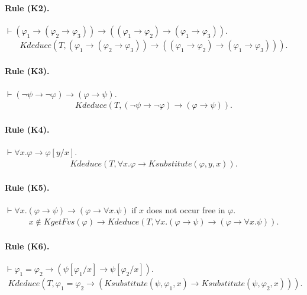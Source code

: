 \documentclass[UTF8]{article}
\theoremstyle{plain}
\theoremstyle{definition}
\theoremstyle{remark}
\newcommand{\kimplies}{\to}
\newcommand{\knot}{\neg}
\newcommand{\kforall}{\forall}
\newcommand{\kequals}{=}
\newcommand{\KgetFvs}{\mathit{KgetFvs}}
\newcommand{\Ksubstitute}{\mathit{Ksubstitute}}
\newcommand{\Kdeduce}{\mathit{Kdeduce}}
\begin{document}
\paragraph{Rule (K2).}
$\vdash (\varphi_1 \to (\varphi_2 \to \varphi_3)) \to ((\varphi_1 \to \varphi_2) \to (\varphi_1 \to \varphi_3))$.
\begin{align*}
\Kdeduce(T, (\varphi_1 \kimplies (\varphi_2 \kimplies \varphi_3)) \kimplies ((\varphi_1 \kimplies \varphi_2) \kimplies (\varphi_1 \kimplies \varphi_3))).
\end{align*}

\paragraph{Rule (K3).}
$\vdash (\neg \psi \to \neg \varphi) \to (\varphi \to \psi)$.
\begin{align*}
\Kdeduce(T, (\knot \psi \kimplies \knot \varphi) \kimplies (\varphi \kimplies \psi)).
\end{align*}

\paragraph{Rule (K4).}
$\vdash \forall x . \varphi \to \varphi[y/x]$.
\begin{align*}
\Kdeduce(T, \kforall x . \varphi \kimplies \Ksubstitute(\varphi, y, x)).
\end{align*}

\paragraph{Rule (K5).}
$\vdash \forall x . (\varphi \to \psi) \to (\varphi \to \forall x . \psi)$ if $x$ does not occur free in $\varphi$. 
\begin{align*}
x \not\in \KgetFvs(\varphi)
\to \Kdeduce(T, \kforall x . (\varphi \kimplies \psi) \kimplies (\varphi \kimplies \kforall x . \psi)).
\end{align*}

\paragraph{Rule (K6).}
$\vdash \varphi_1 = \varphi_2 \to (\psi[\varphi_1/x] \to \psi[\varphi_2/x])$.
\begin{align*}
\Kdeduce(T, \varphi_1 \kequals \varphi_2 \kimplies (\Ksubstitute(\psi, \varphi_1, x) \kimplies \Ksubstitute(\psi, \varphi_2, x))).
\end{align*}
\end{document}
